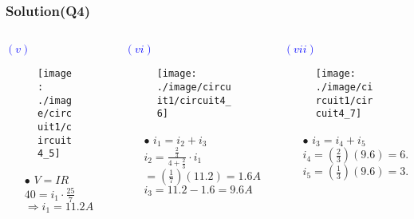 \documentclass{beamer}
\newcommand{\blue}[1]{\textcolor{blue}{#1}}
\begin{document}
\begin{frame}
\frametitle{Solution(Q4)}
\begin{columns}
\begin{column}{4cm}
\blue{$(v)$}
\begin{figure}[H]
  \label{epi_circuit4_5}
  \centering
  \texttt{[image: ./image/circuit1/circuit4\_5]}
\end{figure}
\begin{itemize} \itemsep1pt \parskip0pt 
  \item[$\bullet$] $V = IR$ \newline $40 = i_1 \cdot \frac{25}{7} $ \newline$\Rightarrow i_1 = 11.2A$ \newline \vspace{2 mm}
\end{itemize}
\end{column}

\begin{column}{4.3cm}
\blue{$(vi)$}
\begin{figure}[H]
  \label{epi_circuit4_6}
  \centering
  \texttt{[image: ./image/circuit1/circuit4\_6]}
\end{figure}
\begin{itemize} \itemsep1pt \parskip0pt 
  \item[$\bullet$] $i_1 = i_2 + i_3$ \newline $i_2 = \frac{\frac{2}{3}}{4+\frac{2}{3}} \cdot i_1 $\newline $= (\frac{1}{7})(11.2)=1.6A$ \newline$i_3 = 11.2-1.6 = 9.6A$
\end{itemize}
\end{column}

\begin{column}{4.3cm}
\blue{$(vii)$}
\begin{figure}[H]
  \label{epi_circuit4_7}
  \centering
  \texttt{[image: ./image/circuit1/circuit4\_7]}
\end{figure}
\begin{itemize} \itemsep1pt \parskip0pt 
  \item[$\bullet$] $i_3 = i_4 + i_5$ \newline $i_4 = (\frac{2}{3})(9.6) = 6.4A$\newline $i_5 = (\frac{1}{3})(9.6)=3.2A$ \newline \vspace{3.5 mm}
\end{itemize}
\end{column}
\end{columns}
\end{frame}
\end{document}
